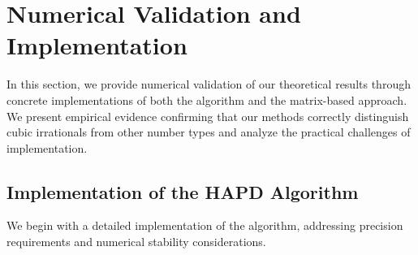 \section{Numerical Validation and Implementation}\label{sec:numerical_validation}

In this section, we provide numerical validation of our theoretical results through concrete implementations of both the \HAPD{} algorithm and the matrix-based approach. We present empirical evidence confirming that our methods correctly distinguish cubic irrationals from other number types and analyze the practical challenges of implementation.

\subsection{Implementation of the HAPD Algorithm}

We begin with a detailed implementation of the \HAPD{} algorithm, addressing precision requirements and numerical stability considerations.

